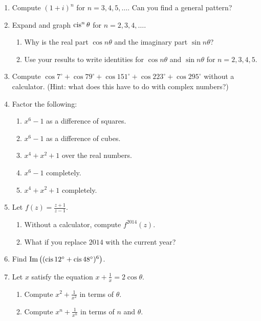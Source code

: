 \documentclass[../gatm.tex]{subfiles}
\begin{document}
\begin{enumerate}
\item Compute $(1+i)^n$ for $n=3,4,5,\ldots$. Can you find a general pattern?
\item Expand and graph $\operatorname{cis}^n \theta$ for $n=2,3,4,\ldots$.

\begin{enumerate}
\item Why is the real part $\cos n\theta$ and the imaginary part $\sin n\theta$?
\item Use your results to write identities for $\cos n\theta$ and $\sin n\theta$ for $n=2,3,4,5$.
\end{enumerate}

\newcommand{\cosdeg}[1] {\cos #1^\circ}

\item Compute $\cosdeg{7} + \cosdeg{79} + \cosdeg{151} + \cosdeg{223} + \cosdeg{295}$ without a calculator. (Hint: what does this have to do with complex numbers?)
\item Factor the following:
\begin{multicols}{2}
\begin{enumerate}
\item $x^6-1$ as a difference of squares.
\item $x^6-1$ as a difference of cubes.
\item $x^4+x^2+1$ over the real numbers.
\item $x^6-1$ completely.
\item $x^4+x^2+1$ completely.
\end{enumerate}
\end{multicols}

\item Let $f(z)=\frac{z+1}{z-1}$.
\begin{enumerate}
\item Without a calculator, compute $f^{2014}(z)$.
\item What if you replace $2014$ with the current year?
\end{enumerate}

\item Find $\operatorname{Im}\left((\operatorname{cis} 12^\circ + \operatorname{cis} 48^\circ)^6\right)$.

\item Let $x$ satisfy the equation $x+\frac{1}{x}=2\cos\theta$.
\begin{enumerate}
\item Compute $x^2+\frac{1}{x^2}$ in terms of $\theta$.
\item Compute $x^n+\frac{1}{x^n}$ in terms of $n$ and $\theta$.
\end{enumerate}
\end{enumerate}
\end{document}
